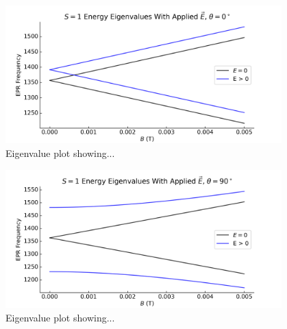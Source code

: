 \begin{figure}[H]
    \begin{center}
        \includegraphics[width=0.95\textwidth]{figures/EFieldParallel.png}
    \end{center}
    \caption{Eigenvalue plot showing... }\label{fig:}
\end{figure}
\begin{figure}[H]
    \begin{center}
        \includegraphics[width=0.95\textwidth]{figures/EFieldPerp.png}
    \end{center}
    \caption{Eigenvalue plot showing... }\label{fig:}
\end{figure}




